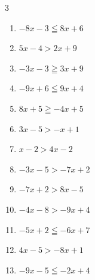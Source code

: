 \begin{multicols}{3}
\begin{enumerate}
  \item $-8x-3\leqq 8x+6$


  \item $5x-4>2x+9$


  \item $-3x-3\geqq 3x+9$

        \phantom{$\displaystyle x\leqq -2$}

  \item $-9x+6\leqq 9x+4$


  \item $8x+5\geqq -4x+5$

        \phantom{$\displaystyle x\geqq 0$}

  \item $3x-5>-x+1$


  \item $x-2>4x-2$

        \phantom{$\displaystyle x<0$}

  \item $-3x-5>-7x+2$


  \item $-7x+2>8x-5$


  \item $-4x-8>-9x+4$


  \item $-5x+2\leqq -6x+7$

        \phantom{$\displaystyle x\leqq 5$}

  \item $4x-5>-8x+1$


\columnbreak %

\resetques

  \item $-9x-5\leqq -2x+4$



\end{enumerate}
\end{multicols}
